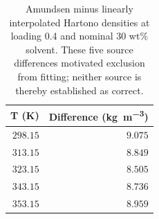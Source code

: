 \begin{table}[!htbp]\small\setlength{\tabcolsep}{3pt}\centering
\caption{Amundsen minus linearly interpolated Hartono densities at loading 0.4 and nominal 30 wt\% solvent. These five source differences motivated exclusion from fitting; neither source is thereby established as correct.}\label{tab:density-source-differences}
\begin{tabular}{@{}rr@{}}
\toprule
T (K) & Difference (\si{\kilogram\per\cubic\metre}) \\
\midrule
$298.15$ & $9.075$ \\
$313.15$ & $8.849$ \\
$323.15$ & $8.505$ \\
$343.15$ & $8.736$ \\
$353.15$ & $8.959$ \\
\bottomrule
\end{tabular}
\end{table}
